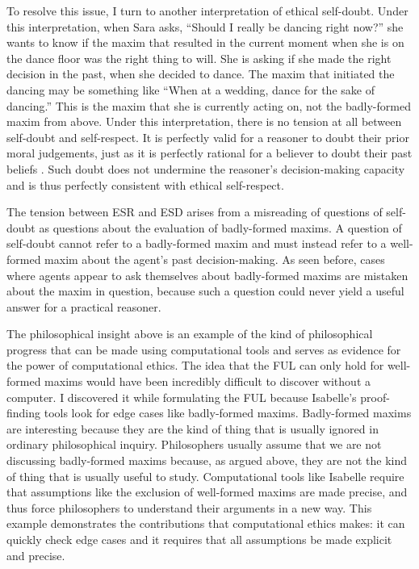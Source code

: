 \begin{isabellebody}
\begin{isamarkuptext}
To resolve this issue, I turn to another interpretation of ethical self-doubt. Under this interpretation, 
when Sara asks, ``Should I really be dancing right now?'' she wants to know if the maxim that 
resulted in the current moment when she is on the dance floor was the right thing to will. She is 
asking if she made the right decision in the past, when she decided to dance. The maxim that initiated 
the dancing may be something like ``When at a wedding, dance for the sake of dancing.'' This is the maxim 
that she is currently acting on, not the badly-formed maxim  from above. Under this interpretation, 
there is no tension at all between self-doubt and self-respect. It is perfectly valid for a reasoner 
to doubt their prior moral judgements, just as it is perfectly rational for a believer to doubt their 
past beliefs \cite[3-4]{christensen}. Such doubt does not undermine the reasoner's decision-making 
capacity and is thus perfectly consistent with ethical self-respect. 

The tension between ESR and ESD arises from a misreading of questions of self-doubt as questions about 
the evaluation of badly-formed maxims. A question of self-doubt cannot refer to a badly-formed maxim and must 
instead refer to a well-formed maxim about the agent's past decision-making. As seen before, cases where 
agents appear to ask themselves about badly-formed maxims are mistaken about the maxim in question, because 
such a question could never yield a useful answer for a practical reasoner.%
\end{isamarkuptext}\isamarkuptrue%
%
\isadelimdocument
%
\endisadelimdocument
%
\isatagdocument
%
\isamarkuptrue%
%
\endisatagdocument
{\isafolddocument}%
%
\isadelimdocument
%
\endisadelimdocument
%
\begin{isamarkuptext}%
The philosophical insight above is an example of the kind of philosophical progress that can be 
made using computational tools and serves as evidence for the power of computational ethics. The 
idea that the FUL can only hold for well-formed maxims would have been
incredibly difficult to discover without a computer. I discovered it while formulating the FUL because 
Isabelle's proof-finding tools look for edge cases like badly-formed maxims. Badly-formed maxims are 
interesting because they are the kind of thing that is usually ignored in ordinary philosophical inquiry. 
Philosophers usually assume that we are not discussing badly-formed maxims because, as argued above, 
they are not the kind of thing that is usually useful to study. Computational tools like Isabelle
require that assumptions like the exclusion of well-formed maxims are made precise, and thus force 
philosophers to understand their arguments in a new way. This example demonstrates the contributions
that computational ethics makes: it can quickly check edge cases and it requires that all assumptions be
made explicit and precise.


\end{isamarkuptext}
\end{isabellebody}
